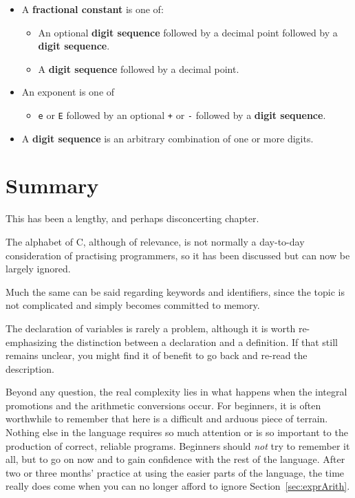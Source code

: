    \begin{itemize}
    \item A \textbf{fractional constant} is one of:
     \begin{itemize}
      \item An optional \textbf{digit sequence} followed by a decimal point
       followed by a \textbf{digit sequence}.
      \item A \textbf{digit sequence} followed by a decimal point.
     \end{itemize}
    

    \item An exponent is one of
     \begin{itemize}
      \item \texttt{e} or \texttt{E} followed by an
       optional \texttt{+} or \texttt{-} followed by a
       \textbf{digit sequence}.
     \end{itemize}
    

    \item A \textbf{digit sequence} is an arbitrary combination of one or more
     digits.
   \end{itemize}

  

 
        \section{Summary}
        


  This has been a lengthy, and perhaps disconcerting chapter.


  The alphabet of C, although of relevance, is not normally a
   day-to-day consideration of practising programmers, so it has been
   discussed but can now be largely ignored.


  Much the same can be said regarding keywords and identifiers, since the
   topic is not complicated and simply becomes committed to memory.


  The declaration of variables is rarely a problem, although it is worth
   re-emphasizing the distinction between a declaration and a definition. If
   that still remains unclear, you might find it of benefit to go back and
   re-read the description.


  Beyond any question, the real complexity lies in what happens when the
   integral promotions and the arithmetic conversions occur. For beginners, it
   is often worthwhile to remember that here is a difficult and arduous piece
   of terrain. Nothing else in the language requires so much attention or is
   so important to the production of correct, reliable programs. Beginners
   should \textit{not} try to remember it all, but to go on now and to gain
   confidence with the rest of the language. After two or three months'
   practice at using the easier parts of the language, the time really does
   come when you can no longer afford to ignore Section~\ref{sec:exprArith}.


